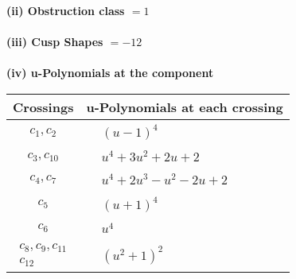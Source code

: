 \documentclass[1p]{elsarticle_modified}
\theoremstyle{definition}
\begin{document}
\flushleft \textbf{(ii) Obstruction class $= 1$}\\~\\
\flushleft \textbf{(iii) Cusp Shapes $= -12$}\\~\\
\newpage\renewcommand{\arraystretch}{1}
\flushleft \textbf{(iv) u-Polynomials at the component}\newline \\
\begin{tabular}{m{50pt}|m{274pt}}
Crossings & \hspace{64pt}u-Polynomials at each crossing \\
\hline $$\begin{aligned}c_{1},c_{2}\end{aligned}$$&$\begin{aligned}
&(u-1)^4
\end{aligned}$\\
\hline $$\begin{aligned}c_{3},c_{10}\end{aligned}$$&$\begin{aligned}
&u^4+3 u^2+2 u+2
\end{aligned}$\\
\hline $$\begin{aligned}c_{4},c_{7}\end{aligned}$$&$\begin{aligned}
&u^4+2 u^3- u^2-2 u+2
\end{aligned}$\\
\hline $$\begin{aligned}c_{5}\end{aligned}$$&$\begin{aligned}
&(u+1)^4
\end{aligned}$\\
\hline $$\begin{aligned}c_{6}\end{aligned}$$&$\begin{aligned}
&u^4
\end{aligned}$\\
\hline $$\begin{aligned}c_{8},c_{9},c_{11}\\c_{12}\end{aligned}$$&$\begin{aligned}
&(u^2+1)^2
\end{aligned}$\\
\hline
\end{tabular}\\~\\
\end{document}
